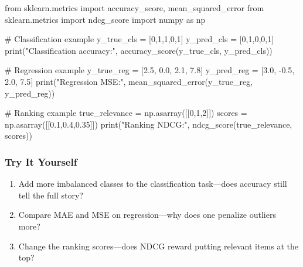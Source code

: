 \documentclass[
  letterpaper,
  DIV=11,
  numbers=noendperiod]{scrreprt}
\newenvironment{Shaded}{\begin{snugshade}}{\end{snugshade}}
\newcommand{\BuiltInTok}[1]{\textcolor[rgb]{0.00,0.23,0.31}{#1}}
\newcommand{\CommentTok}[1]{\textcolor[rgb]{0.37,0.37,0.37}{#1}}
\newcommand{\DecValTok}[1]{\textcolor[rgb]{0.68,0.00,0.00}{#1}}
\newcommand{\FloatTok}[1]{\textcolor[rgb]{0.68,0.00,0.00}{#1}}
\newcommand{\ImportTok}[1]{\textcolor[rgb]{0.00,0.46,0.62}{#1}}
\newcommand{\NormalTok}[1]{\textcolor[rgb]{0.00,0.23,0.31}{#1}}
\newcommand{\OperatorTok}[1]{\textcolor[rgb]{0.37,0.37,0.37}{#1}}
\newcommand{\StringTok}[1]{\textcolor[rgb]{0.13,0.47,0.30}{#1}}
\providecommand{\tightlist}{%
  \setlength{\itemsep}{0pt}\setlength{\parskip}{0pt}}
\begin{document}
\begin{Shaded}
\begin{Highlighting}[]
\ImportTok{from}\NormalTok{ sklearn.metrics }\ImportTok{import}\NormalTok{ accuracy\_score, mean\_squared\_error}
\ImportTok{from}\NormalTok{ sklearn.metrics }\ImportTok{import}\NormalTok{ ndcg\_score}
\ImportTok{import}\NormalTok{ numpy }\ImportTok{as}\NormalTok{ np}

\CommentTok{\# Classification example}
\NormalTok{y\_true\_cls }\OperatorTok{=}\NormalTok{ [}\DecValTok{0}\NormalTok{,}\DecValTok{1}\NormalTok{,}\DecValTok{1}\NormalTok{,}\DecValTok{0}\NormalTok{,}\DecValTok{1}\NormalTok{]}
\NormalTok{y\_pred\_cls }\OperatorTok{=}\NormalTok{ [}\DecValTok{0}\NormalTok{,}\DecValTok{1}\NormalTok{,}\DecValTok{0}\NormalTok{,}\DecValTok{0}\NormalTok{,}\DecValTok{1}\NormalTok{]}
\BuiltInTok{print}\NormalTok{(}\StringTok{"Classification accuracy:"}\NormalTok{, accuracy\_score(y\_true\_cls, y\_pred\_cls))}

\CommentTok{\# Regression example}
\NormalTok{y\_true\_reg }\OperatorTok{=}\NormalTok{ [}\FloatTok{2.5}\NormalTok{, }\FloatTok{0.0}\NormalTok{, }\FloatTok{2.1}\NormalTok{, }\FloatTok{7.8}\NormalTok{]}
\NormalTok{y\_pred\_reg }\OperatorTok{=}\NormalTok{ [}\FloatTok{3.0}\NormalTok{, }\OperatorTok{{-}}\FloatTok{0.5}\NormalTok{, }\FloatTok{2.0}\NormalTok{, }\FloatTok{7.5}\NormalTok{]}
\BuiltInTok{print}\NormalTok{(}\StringTok{"Regression MSE:"}\NormalTok{, mean\_squared\_error(y\_true\_reg, y\_pred\_reg))}

\CommentTok{\# Ranking example}
\NormalTok{true\_relevance }\OperatorTok{=}\NormalTok{ np.asarray([[}\DecValTok{0}\NormalTok{,}\DecValTok{1}\NormalTok{,}\DecValTok{2}\NormalTok{]])}
\NormalTok{scores }\OperatorTok{=}\NormalTok{ np.asarray([[}\FloatTok{0.1}\NormalTok{,}\FloatTok{0.4}\NormalTok{,}\FloatTok{0.35}\NormalTok{]])}
\BuiltInTok{print}\NormalTok{(}\StringTok{"Ranking NDCG:"}\NormalTok{, ndcg\_score(true\_relevance, scores))}
\end{Highlighting}
\end{Shaded}

\subsubsection{Try It Yourself}\label{try-it-yourself-82}

\begin{enumerate}
\def\labelenumi{\arabic{enumi}.}
\tightlist
\item
  Add more imbalanced classes to the classification task---does accuracy
  still tell the full story?
\item
  Compare MAE and MSE on regression---why does one penalize outliers
  more?
\item
  Change the ranking scores---does NDCG reward putting relevant items at
  the top?
\end{enumerate}
\end{document}
